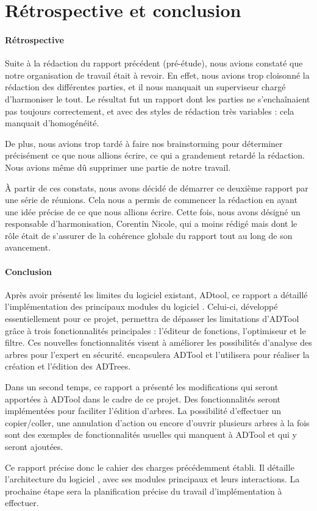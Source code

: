 \section{Rétrospective et conclusion}
    \paragraph{Rétrospective} Suite à la rédaction du rapport précédent (pré-étude), nous avions constaté que notre organisation de travail était à revoir. En effet, nous avions trop cloisonné la rédaction des différentes parties, et il nous manquait un superviseur chargé d'harmoniser le tout. Le résultat fut un rapport dont les parties ne s'enchaînaient pas toujours correctement, et avec des styles de rédaction très variables : cela manquait d'homogénéité.

    De plus, nous avions trop tardé à faire nos \og brainstorming \fg{} pour déterminer précisément ce que nous allions écrire, ce qui a grandement retardé la rédaction. Nous avions même dû supprimer une partie de notre travail.

    À partir de ces constats, nous avons décidé de démarrer ce deuxième rapport par une série de réunions. Cela nous a permis de commencer la rédaction en ayant une idée précise de ce que nous allions écrire. Cette fois, nous avons désigné un responsable d'harmonisation, Corentin {\sc Nicole}, qui a moins rédigé mais dont le rôle était de s'assurer de la cohérence globale du rapport tout au long de son avancement.

    \paragraph{Conclusion} Après avoir présenté les limites du logiciel existant, ADtool, ce rapport a détaillé l'implémentation des principaux modules du logiciel \glasir{}. Celui-ci, développé essentiellement pour ce projet, permettra de dépasser les limitations d'ADTool grâce à trois fonctionnalités principales : l'éditeur de fonctions, l'optimiseur et le filtre. Ces nouvelles fonctionnalités visent à améliorer les possibilités d'analyse des arbres pour l'expert en sécurité. \glasir{} encapsulera ADTool et l'utilisera pour réaliser la création et l'édition des ADTrees.

    Dans un second temps, ce rapport a présenté les modifications qui seront apportées à ADTool dans le cadre de ce projet. Des fonctionnalités seront implémentées pour faciliter l'édition d'arbres. La possibilité d'effectuer un copier/coller, une annulation d'action ou encore d'ouvrir plusieurs arbres à la fois sont des exemples de fonctionnalités usuelles qui manquent à ADTool et qui y seront ajoutées.

    Ce rapport précise donc le cahier des charges précédemment établi. Il détaille l'architecture du logiciel \glasir{}, avec ses modules principaux et leurs interactions. La prochaine étape sera la planification précise du travail d'implémentation à effectuer.